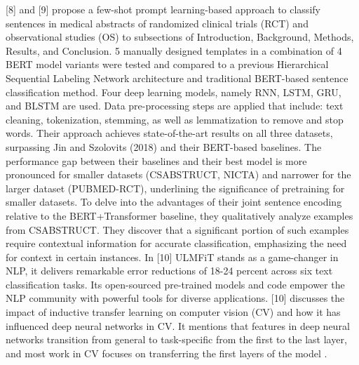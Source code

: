 \documentclass[12pt,a4paper]{report}     %
\begin{document}
\begin{normalsize}
{[8] and [9] propose a few-shot prompt learning-based approach to classify sentences in medical abstracts of randomized clinical trials (RCT) and observational studies (OS) to subsections of Introduction, Background, Methods, Results, and Conclusion. 5 manually designed templates in a combination of 4 BERT model variants were tested and compared to a previous Hierarchical Sequential Labeling Network architecture and traditional BERT-based sentence classification method. Four deep learning models, namely RNN, LSTM, GRU, and BLSTM are used. Data pre-processing steps are applied that include: text cleaning, tokenization, stemming, as well as lemmatization to remove and stop words. Their approach achieves state-of-the-art results on all three datasets, surpassing Jin and Szolovits (2018) and their BERT-based baselines. The performance gap between their baselines and their best model is more pronounced for smaller datasets (CSABSTRUCT, NICTA) and narrower for the larger dataset (PUBMED-RCT), underlining the significance of pretraining for smaller datasets. To delve into the advantages of their joint sentence encoding relative to the BERT+Transformer baseline, they qualitatively analyze examples from CSABSTRUCT. They discover that a significant portion of such examples require contextual information for accurate classification, emphasizing the need for context in certain instances. In [10] ULMFiT stands as a game-changer in NLP, it delivers remarkable error reductions of 18-24 percent across six text classification tasks. Its open-sourced pre-trained models and code empower the NLP community with powerful tools for diverse applications.
[10] discusses the impact of inductive transfer learning on computer vision (CV) and how it has influenced deep neural networks in CV. It mentions that features in deep neural networks transition from general to task-specific from the first to the last layer, and most work in CV focuses on transferring the first layers of the model .

}
\end{normalsize}
\end{document}
